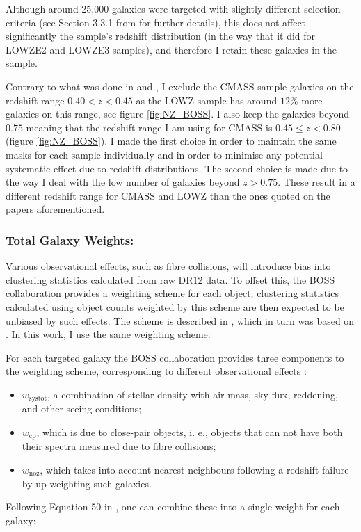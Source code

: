 \qquad Although around 25,000 galaxies were targeted with slightly different selection criteria (see Section 3.3.1 from \cite{BOSSCatalogue2016} for further details), this does not affect significantly the sample's redshift distribution (in the way that it did for LOWZE2 and LOWZE3 samples), and therefore I retain these galaxies in the sample.

\qquad Contrary to what was done in \cite{BOSSCatalogue2016} and \cite{2016BOSSCosmology}, I exclude the CMASS sample galaxies on the redshift range $0.40<z<0.45$ as the LOWZ sample has around $12\%$ more galaxies on this range, see figure \ref{fig:NZ_BOSS}. I also keep the galaxies beyond $0.75$ meaning that the redshift range I am using for CMASS is $0.45 \leq z < 0.80$ (figure \ref{fig:NZ_BOSS}). I made the first choice in order to maintain the same masks for each sample individually and in order to minimise any potential systematic effect due to redshift distributions. The second choice is made due to the way I deal with the low number of galaxies beyond $ z > 0.75$. These result in a different redshift range for CMASS and LOWZ than the ones quoted on the papers aforementioned.

\subsubsection{Total Galaxy Weights:}\label{Sec:GalWeights}
Various observational effects, such as fibre collisions, will introduce bias into clustering statistics calculated from raw DR12 data. To offset this, the BOSS collaboration provides a weighting scheme for each object; clustering statistics calculated using object counts weighted by this scheme are then expected to be unbiased by such effects. The scheme is described in \cite{BOSSCatalogue2016}, which in turn was based on \cite{2014Anderson}. In this work, I use the same weighting scheme:

\qquad For each targeted galaxy the BOSS collaboration provides three components to the weighting scheme, corresponding to different observational effects \citep{BOSSCatalogue2016,2014Anderson}:
\begin{itemize}
\item{$w_{\text{systot}}$, a combination of stellar density with air mass, sky flux, reddening, and other seeing conditions;}
\item{$w_{\text{cp}}$, which is due to close-pair objects, i. e., objects that can not have both their spectra measured due to fibre collisions;}
\item{$w_{\text{noz}}$, which takes into account nearest neighbours following a redshift failure by up-weighting such galaxies.}
\end{itemize}
Following Equation 50 in \cite{BOSSCatalogue2016}, one can combine these into a single weight for each galaxy:

